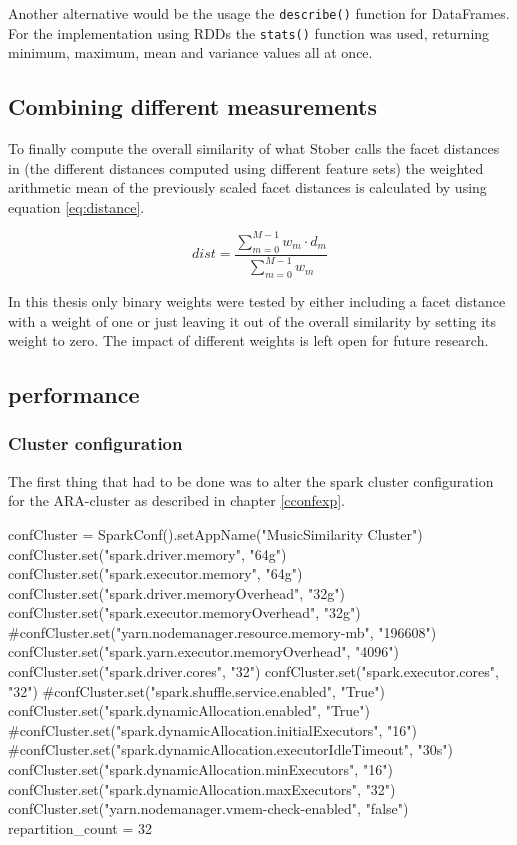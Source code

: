 \noindent Another alternative would be the usage the \lstinline{describe()} function for DataFrames. For the implementation using RDDs the \lstinline{stats()} function was used, returning minimum, maximum, mean and variance values all at once. 

\subsection{Combining different measurements}\label{weighedsum}

To finally compute the overall similarity of what Stober calls the facet distances in \cite[pp. 543ff]{musicdata} (the different distances computed using different feature sets) the weighted arithmetic mean of the previously scaled facet distances is calculated by using equation \ref{eq:distance}.

\begin{equation} \label{eq:distance}
dist = \frac{\sum_{m = 0}^{M - 1}{w_m \cdot d_m}}{\sum_{m = 0}^{M - 1}{w_m}}
\end{equation}

\noindent In this thesis only binary weights were tested by either including a facet distance with a weight of one or just leaving it out of the overall similarity by setting its weight to zero. The impact of different weights is left open for future research. 

\subsection{performance}\label{sparkperf}

\subsubsection{Cluster configuration} %

The first thing that had to be done was to alter the spark cluster configuration for the ARA-cluster as described in chapter \ref{cconfexp}.

\begin{pythonCode}[frame=single,label={lst:clust},caption={cluster setup},captionpos=b]
confCluster = SparkConf().setAppName("MusicSimilarity Cluster")
confCluster.set("spark.driver.memory", "64g")
confCluster.set("spark.executor.memory", "64g")
confCluster.set("spark.driver.memoryOverhead", "32g")
confCluster.set("spark.executor.memoryOverhead", "32g")
#confCluster.set("yarn.nodemanager.resource.memory-mb", "196608")
confCluster.set("spark.yarn.executor.memoryOverhead", "4096")
confCluster.set("spark.driver.cores", "32")
confCluster.set("spark.executor.cores", "32")
#confCluster.set("spark.shuffle.service.enabled", "True")
confCluster.set("spark.dynamicAllocation.enabled", "True")
#confCluster.set("spark.dynamicAllocation.initialExecutors", "16")
#confCluster.set("spark.dynamicAllocation.executorIdleTimeout", "30s")	
confCluster.set("spark.dynamicAllocation.minExecutors", "16")
confCluster.set("spark.dynamicAllocation.maxExecutors", "32")
confCluster.set("yarn.nodemanager.vmem-check-enabled", "false")
repartition_count = 32
\end{pythonCode}


